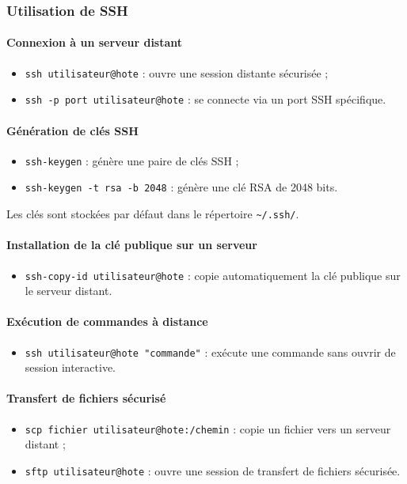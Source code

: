 \documentclass{article}
\begin{document}
\subsubsection{Utilisation de SSH}

\paragraph{Connexion à un serveur distant}
\begin{itemize}
    \item \texttt{ssh utilisateur@hote} : ouvre une session distante sécurisée ;
    \item \texttt{ssh -p port utilisateur@hote} : se connecte via un port SSH spécifique.
\end{itemize}

\paragraph{Génération de clés SSH}
\begin{itemize}
    \item \texttt{ssh-keygen} : génère une paire de clés SSH ;
    \item \texttt{ssh-keygen -t rsa -b 2048} : génère une clé RSA de 2048 bits.
\end{itemize}
Les clés sont stockées par défaut dans le répertoire \texttt{\textasciitilde/.ssh/}.

\paragraph{Installation de la clé publique sur un serveur}
\begin{itemize}
    \item \texttt{ssh-copy-id utilisateur@hote} : copie automatiquement la clé publique sur le serveur distant.
\end{itemize}

\paragraph{Exécution de commandes à distance}
\begin{itemize}
    \item \texttt{ssh utilisateur@hote "commande"} : exécute une commande sans ouvrir de session interactive.
\end{itemize}

\paragraph{Transfert de fichiers sécurisé}
\begin{itemize}
    \item \texttt{scp fichier utilisateur@hote:/chemin} : copie un fichier vers un serveur distant ;
    \item \texttt{sftp utilisateur@hote} : ouvre une session de transfert de fichiers sécurisée.
\end{itemize}
\end{document}
